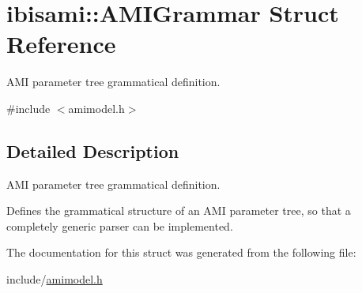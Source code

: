 \hypertarget{structibisami_1_1_a_m_i_grammar}{}\section{ibisami\+:\+:A\+M\+I\+Grammar Struct Reference}
\label{structibisami_1_1_a_m_i_grammar}


A\+M\+I parameter tree grammatical definition.  




{\ttfamily \#include $<$amimodel.\+h$>$}



\subsection{Detailed Description}
A\+M\+I parameter tree grammatical definition. 

Defines the grammatical structure of an A\+M\+I parameter tree, so that a completely generic parser can be implemented. 

The documentation for this struct was generated from the following file\+:\begin{DoxyCompactItemize}
\item 
include/\hyperlink{amimodel_8h}{amimodel.\+h}\end{DoxyCompactItemize}
